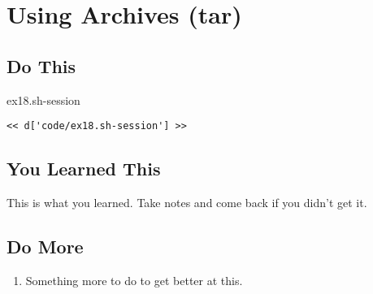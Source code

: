 \chapter{Using Archives (tar)}

\section{Do This}

\begin{code}{ex18.sh-session}
\begin{Verbatim}
<< d['code/ex18.sh-session'] >>
\end{Verbatim}
\end{code}


\section{You Learned This}

This is what you learned.  Take notes and come back if you didn't get it.

\section{Do More}

\begin{enumerate}
\item Something more to do to get better at this.
\end{enumerate}

